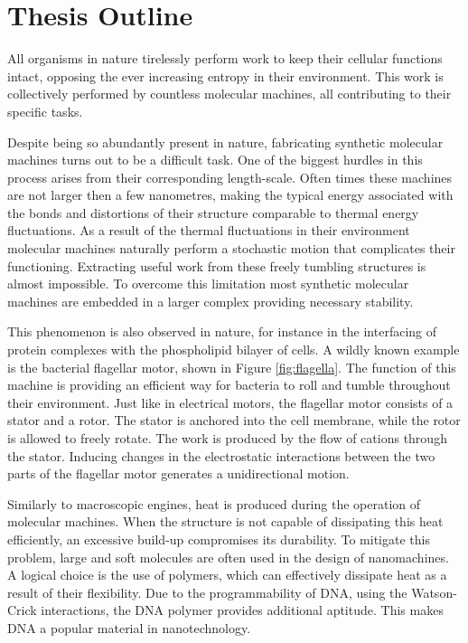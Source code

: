 \section{Thesis Outline}

All organisms in nature tirelessly perform work to keep their cellular functions
intact, opposing the ever increasing entropy in their environment. This work is
collectively performed by countless molecular machines, all contributing to
their specific tasks.

Despite being so abundantly present in nature, fabricating synthetic molecular machines
turns out to be a difficult task. One of the biggest hurdles in this process arises from
their corresponding length-scale. Often times these machines are not larger then
a few nanometres, making the typical energy associated with the bonds and
distortions of their structure comparable to thermal energy fluctuations. As a result of
the thermal fluctuations in their environment molecular machines naturally perform
a stochastic motion that complicates their functioning.  Extracting useful work from
these freely tumbling structures is almost impossible. To overcome this limitation most
synthetic molecular machines are embedded in a larger complex providing necessary
stability.\cite{Watson2016}

This phenomenon is also observed in nature, for instance in the interfacing of protein
complexes with the phospholipid bilayer of cells.  A wildly known example is the
bacterial flagellar motor, shown in Figure \ref{fig:flagella}. The function of this
machine is providing an efficient way for bacteria to
roll and tumble throughout their environment. Just like in electrical motors, the
flagellar motor consists of a stator and a rotor. The stator is anchored into the cell
membrane,
while the rotor is allowed to freely rotate. The work is produced by the flow of cations
through the stator. Inducing changes in the electrostatic interactions between the two
parts of the flagellar motor generates a unidirectional motion.\cite{sowa_berry_2008}

Similarly to macroscopic engines, heat is produced during the operation of molecular
machines. When the structure is not capable of dissipating this heat efficiently, an
excessive build-up compromises its durability. To mitigate this problem, large and soft
molecules are often used in the design of nanomachines. A logical choice
is the use of polymers, which can effectively dissipate heat as a result of their
flexibility.  Due to the programmability of DNA, using the Watson-Crick interactions,
the DNA polymer provides additional aptitude. This makes DNA a popular material in
nanotechnology.

